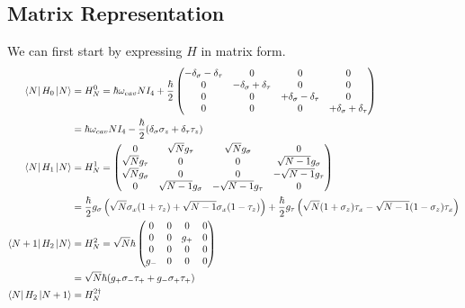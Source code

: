 \documentclass[
    preprint,
    amsmath,amssymb,
    aps,
    prb,
    floatfix,
]{revtex4-2}
\begin{document}
    \subsection{Matrix Representation}
        We can first start by expressing $H$ in matrix form.
        \begin{align}
            \bra{N}H_0\ket{N}&=H^0_N= \hbar\omega_{cav}NI_4 + \frac{\hbar}{2} \begin{pmatrix}
                 - \delta_\sigma - \delta_\tau & 0 & 0 & 0 \\
                0& - \delta_\sigma + \delta_\tau & 0 & 0 \\
                0&0&+ \delta_\sigma - \delta_\tau  & 0 \\
                0 & 0 & 0 & + \delta_\sigma + \delta_\tau
            \end{pmatrix} \\
            &= \hbar\omega_{cav}NI_4-\frac{\hbar}{2}(\delta_\sigma\sigma_z+\delta_\tau\tau_z) \\
            \bra{N}H_1\ket{N}&=H^1_N=\begin{pmatrix}
               0 & \sqrt{N}g_\tau & \sqrt{N}g_\sigma & 0 \\
               \sqrt{N}g_\tau & 0 & 0 & \sqrt{N-1}g_\sigma \\
               \sqrt{N}g_\sigma & 0 & 0 & -\sqrt{N-1}g_\tau \\
               0 & \sqrt{N-1}g_\sigma & -\sqrt{N-1}g_\tau & 0
           \end{pmatrix} \\
           &=\frac{\hbar}{2}g_\sigma\left(\sqrt{N}\sigma_x(1+\tau_z)+\sqrt{N-1}\sigma_x(1-\tau_z)\right)+\frac{\hbar}{2}g_\tau\left(\sqrt{N}(1+\sigma_z)\tau_x-\sqrt{N-1}(1-\sigma_z)\tau_x\right)\\
            \bra{N+1}H_2\ket{N}&=H^2_N= \sqrt{N}\hbar\begin{pmatrix}
                0 & 0 & 0 & 0 \\
                0 & 0 &  g_+ & 0 \\
                0 & 0 & 0 & 0 \\
                 g_- & 0 & 0 & 0
            \end{pmatrix} \\
            &= \sqrt{N}\hbar(g_+\sigma_-\tau_++g_-\sigma_+\tau_+) \\
            \bra{N}H_2\ket{N+1} &= H_N^{2\dagger}
        \end{align}
\end{document}
